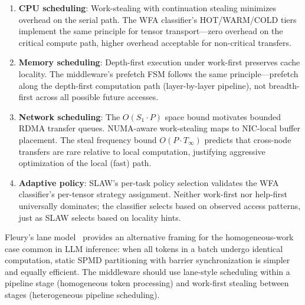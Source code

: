 \documentclass[11pt,letterpaper]{article}
\begin{document}
\begin{enumerate}
    \item \textbf{CPU scheduling}: Work-stealing with continuation stealing minimizes overhead on the serial path. The WFA classifier's HOT/WARM/COLD tiers implement the same principle for tensor transport---zero overhead on the critical compute path, higher overhead acceptable for non-critical transfers.

    \item \textbf{Memory scheduling}: Depth-first execution under work-first preserves cache locality. The middleware's prefetch FSM follows the same principle---prefetch along the depth-first computation path (layer-by-layer pipeline), not breadth-first across all possible future accesses.

    \item \textbf{Network scheduling}: The $O(S_1 \cdot P)$ space bound motivates bounded RDMA transfer queues. NUMA-aware work-stealing maps to NIC-local buffer placement. The steal frequency bound $O(P \cdot T_\infty)$ predicts that cross-node transfers are rare relative to local computation, justifying aggressive optimization of the local (fast) path.

    \item \textbf{Adaptive policy}: SLAW's per-task policy selection validates the WFA classifier's per-tensor strategy assignment. Neither work-first nor help-first universally dominates; the classifier selects based on observed access patterns, just as SLAW selects based on locality hints.
\end{enumerate}

Fleury's lane model~\cite{fleury2025multicore} provides an alternative framing for the homogeneous-work case common in LLM inference: when all tokens in a batch undergo identical computation, static SPMD partitioning with barrier synchronization is simpler and equally efficient. The middleware should use lane-style scheduling within a pipeline stage (homogeneous token processing) and work-first stealing between stages (heterogeneous pipeline scheduling).



\end{document}
